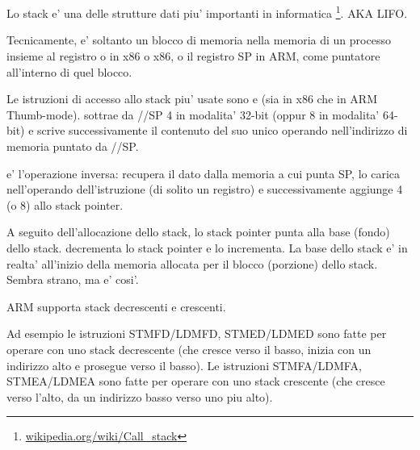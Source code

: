 \section{\Stack}
\label{sec:stack}
\myindex{\Stack}

Lo stack e' una delle strutture dati piu' importanti in informatica
\footnote{\href{http://go.yurichev.com/17119}{wikipedia.org/wiki/Call\_stack}}.
\ac{AKA} \ac{LIFO}.

Tecnicamente, e' soltanto un blocco di memoria nella memoria di un processo insieme al registro \ESP o \RSP in x86 o x86, o il registro \ac{SP} in ARM, come puntatore all'interno di quel blocco.

Le istruzioni di accesso allo stack piu' usate sono \PUSH e \POP (sia in x86 che in ARM Thumb-mode).
\PUSH sottrae da \ESP/\RSP/\ac{SP} 4 in modalita' 32-bit (oppur 8 in modalita' 64-bit) e scrive successivamente il contenuto del suo unico operando nell'indirizzo di memoria puntato da \ESP/\RSP/\ac{SP}.

\POP e' l'operazione inversa: recupera il dato dalla memoria a cui punta \ac{SP}, lo carica nell'operando dell'istruzione (di solito un registro)
e successivamente aggiunge 4 (o 8) allo \gls{stack pointer}.

A seguito dell'allocazione dello stack, lo \gls{stack pointer} punta alla base (fondo) dello stack.
\PUSH decrementa lo \gls{stack pointer} e \POP lo incrementa.
La base dello stack e' in realta' all'inizio della memoria allocata per il blocco (porzione) dello stack. Sembra strano, ma e' cosi'.

ARM supporta stack decrescenti e crescenti.


Ad esempio le istruzioni \ac{STMFD}/\ac{LDMFD}, \ac{STMED}/\ac{LDMED} sono fatte per operare con uno stack decrescente (che cresce verso il basso, inizia con un indirizzo alto e prosegue verso il basso).
Le istruzioni \ac{STMFA}/\ac{LDMFA}, \ac{STMEA}/\ac{LDMEA} sono fatte per operare con uno stack crescente (che cresce verso l'alto, da un indirizzo basso verso uno piu alto).


